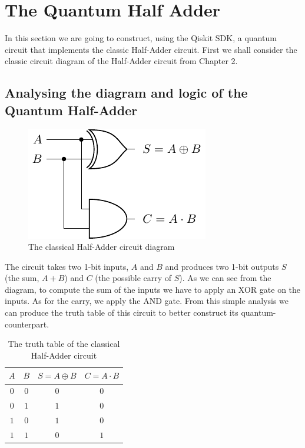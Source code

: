 \section{The Quantum Half Adder}
In this section we are going to construct, using the Qiskit SDK, a quantum circuit that implements the classic Half-Adder circuit.
First we shall consider the classic circuit diagram of the Half-Adder circuit from Chapter 2.

\subsection{Analysing the diagram and logic of the Quantum Half-Adder}

\begin{figure}[!ht]
    \centering
    \includegraphics{images/5_Implementation/classical_halfadder_diagram.pdf}
    \caption{The classical Half-Adder circuit diagram}
\end{figure}

The circuit takes two 1-bit inputs, $A$ and $B$ and produces two 1-bit outputs $S$ (the sum, $A + B$) and $C$ (the possible carry of $S$).
As we can see from the diagram, to compute the sum of the inputs we have to apply an XOR gate on the inputs. As for the carry, we apply the
AND gate. From this simple analysis we can produce the truth table of this circuit to better construct its quantum-counterpart.

\begin{table}[!ht]
    \centering
    \begin{tabular}{c c|c c}
        $A$ & $B$ & $S = A \oplus B$ & $C = A \cdot B$ \\
        \hline
        $0$ & $0$ & $0$ & $0$ \\
        $0$ & $1$ & $1$ & $0$ \\
        $1$ & $0$ & $1$ & $0$ \\
        $1$ & $1$ & $0$ & $1$ \\
    \end{tabular}
    \caption{The truth table of the classical Half-Adder circuit}
\end{table}

